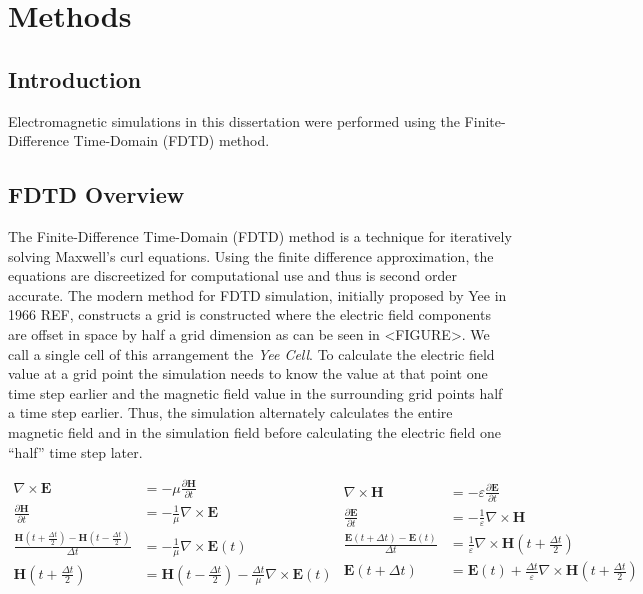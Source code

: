 \documentclass[./JimHeneghanDissertation.tex]{subfiles}
\begin{document}
	\chapter{Methods}
		\section{Introduction}
			Electromagnetic simulations in this dissertation were performed using the Finite-Difference Time-Domain (FDTD) method. 
		\section{FDTD Overview}
			The Finite-Difference Time-Domain (FDTD) method is a technique for iteratively solving Maxwell's curl equations. Using the finite difference approximation, the equations are discreetized for computational use and thus is second order accurate. The modern method for FDTD simulation, initially proposed by Yee in 1966 REF, constructs a grid is constructed where the electric field components are offset in space by half a grid dimension as can be seen in <FIGURE>. We call a single cell of this arrangement the \textit{Yee Cell}. To calculate the electric field value at a grid point the simulation needs to know the value at that point one time step earlier and the magnetic field value in the surrounding grid points half a time step earlier. Thus, the simulation alternately calculates the entire magnetic field and in the simulation field before calculating the electric field one “half” time step later. 
			
			\begin{equation} \label{eq1}
			\begin{split}
				\nabla \times \mathbf{E} &= -\mu \frac{\partial \mathbf{H}}{\partial t} \\ 
				\frac{\partial \mathbf{H}}{\partial t} &= -\frac{1}{\mu} \nabla \times \mathbf{E} \\
				\frac{\mathbf{H}(t+\frac{\Delta t}{2}) - \mathbf{H}(t-\frac{\Delta t}{2})}{\Delta t} &= -\frac{1}{\mu} \nabla \times \mathbf{E}(t) \\
				\mathbf{H}(t+\frac{\Delta t}{2})  &= \mathbf{H}(t-\frac{\Delta t}{2}) -\frac{\Delta t}{\mu} \nabla \times \mathbf{E}(t) \\
			\end{split}
			\begin{split}
				\nabla \times \mathbf{H} &= -\varepsilon \frac{\partial \mathbf{E}}{\partial t} \\ 
				\frac{\partial \mathbf{E}}{\partial t} &= -\frac{1}{\varepsilon}\nabla \times \mathbf{H}\\
				\frac{\mathbf{E}(t+\Delta t)-\mathbf{E}(t)}{\Delta t} &= \frac{1}{\varepsilon}\nabla \times \mathbf{H}(t+\frac{\Delta t}{2}) \\
				\mathbf{E}(t+\Delta t) &= \mathbf{E}(t) + \frac{\Delta t}{\varepsilon}\nabla \times \mathbf{H}(t+\frac{\Delta t}{2}) \\
			\end{split}
			\end{equation}
\end{document}
